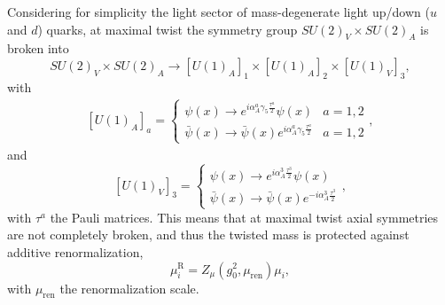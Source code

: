 Considering for simplicity the light sector of mass-degenerate light up/down ($u$ and $d$) quarks, at maximal twist the symmetry group $SU(2)_V\times SU(2)_A$ is broken into
\begin{equation}
SU(2)_V\times SU(2)_A\rightarrow[U(1)_A]_1\times[U(1)_A]_2\times[U(1)_V]_3,
\end{equation}
with 
\begin{align}
\left[U(1)_A\right]_a=\left\{\begin{matrix}
\psi(x)\rightarrow e^{i\alpha_A^a\gamma_5\frac{\tau^a}{2}}\psi(x) & a=1,2 \\ 
\bar{\psi}(x)\rightarrow \bar{\psi}(x)e^{i\alpha_A^a\gamma_5\frac{\tau^a}{2}} & a=1,2
\end{matrix}\right.,
\end{align}
and
\begin{equation}
\left[U(1)_V\right]_3=\left\{\begin{matrix}
\psi(x)\rightarrow e^{i\alpha_A^3\frac{\tau^3}{2}}\psi(x) \\ 
\bar{\psi}(x)\rightarrow \bar{\psi}(x)e^{-i\alpha_A^3\frac{\tau^3}{2}}
\end{matrix}\right.,
\end{equation}
with $\tau^{a}$ the Pauli matrices. This means that at maximal twist axial symmetries are not completely broken, and thus the twisted mass is protected against additive renormalization,
\begin{equation}
\label{ch_foundation:eq:muR}
\mu_i^{\textrm{R}}=Z_{\mu}(g_0^2,\mu_{\textrm{ren}})\mu_i,
\end{equation}
with $\mu_{\textrm{ren}}$ the renormalization scale.

